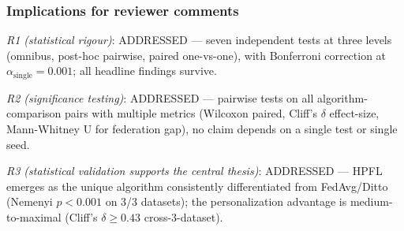 \documentclass[conference]{IEEEtran}
\begin{document}
\begin{table}[htbp]
\centering
\caption{Map between headline statistical claims of §IV.E (paper main) and their derivation in this supplementary.}
\label{tab:tier_b_headlines}
\small
\setlength{\tabcolsep}{4pt}
\end{table}

\subsubsection*{Implications for reviewer comments}

\emph{R1 (statistical rigour)}: ADDRESSED --- seven independent tests at three levels (omnibus, post-hoc pairwise, paired one-vs-one), with Bonferroni correction at $\alpha_{\text{single}}{=}0.001$; all headline findings survive.

\emph{R2 (significance testing)}: ADDRESSED --- pairwise tests on all algorithm-comparison pairs with multiple metrics (Wilcoxon paired, Cliff's $\delta$ effect-size, Mann-Whitney U for federation gap), no claim depends on a single test or single seed.

\emph{R3 (statistical validation supports the central thesis)}: ADDRESSED --- HPFL emerges as the unique algorithm consistently differentiated from FedAvg/Ditto (Nemenyi $p<0.001$ on 3/3 datasets); the personalization advantage is medium-to-maximal (Cliff's $\delta\geq 0.43$ cross-3-dataset).
\end{document}
